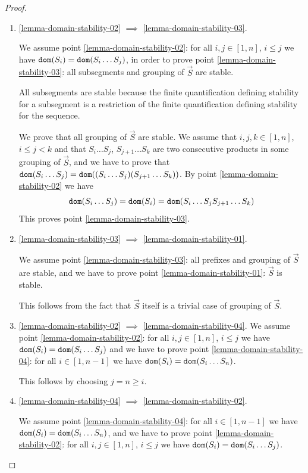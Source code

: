 \documentclass{lmcs}
\begin{document}
\begin{proof}
\begin{enumerate}
\item
\ref{lemma-domain-stability-02} $\implies$ \ref{lemma-domain-stability-03}.

We assume point \ref{lemma-domain-stability-02}: 
for all $i, j \in [1, n]$, $i \le j$ we have ${\tt dom}(S_i)  =  {\tt dom}(S_i \ldots S_j)$,
in order to prove point \ref{lemma-domain-stability-03}:
all subsegments and grouping of $\vec{S}$ are stable. 

All subsegments are stable because the finite quantification defining stability for a subsegment 
is a restriction of the finite quantification defining stability for the sequence. 

We prove that all grouping of $\vec{S}$ are stable. We assume that
$i, j,k\in [1, n]$, $i \le j < k$ and that $S_i \ldots S_j$, $S_{j+1} \ldots S_k$
are two consecutive products in some grouping of $\vec{S}$, and we have to prove 
that ${\tt dom}(S_i \ldots S_j) = {\tt dom}( (S_i \ldots S_j) (S_{j+1} \ldots S_k))$. 
By point \ref{lemma-domain-stability-02} we have 
$$
{\tt dom}(S_i \ldots S_j) = {\tt dom}(S_i) = {\tt dom}(S_i \ldots S_j S_{j+1} \ldots S_k)
$$
This proves point \ref{lemma-domain-stability-03}.


\item
\ref{lemma-domain-stability-03} $\implies$ \ref{lemma-domain-stability-01}.

We assume point \ref{lemma-domain-stability-03}: all prefixes 
and grouping of $\vec{S}$ are stable,
and we have to prove point \ref{lemma-domain-stability-01}: $\vec{S}$ is stable. 

This follows from the fact that $\vec{S}$ itself is a trivial case of grouping of $\vec{S}$.


\item
\ref{lemma-domain-stability-02} $\implies$  \ref{lemma-domain-stability-04}.
We assume point \ref{lemma-domain-stability-02}:
for all $i, j \in [1, n]$, $i \le j$ we have ${\tt dom}(S_i) =  {\tt dom}(S_i \ldots S_j)$
and we have to prove point \ref{lemma-domain-stability-04}: 
for all $i \in [1, n-1]$ we have ${\tt dom}(S_i) =  {\tt dom}(S_i \ldots S_n)$.

This follows by choosing $j=n \ge i$.


\item
\ref{lemma-domain-stability-04} $\implies$  \ref{lemma-domain-stability-02}.

We assume point \ref{lemma-domain-stability-04}: 
for all $i \in [1, n-1]$ we have ${\tt dom}(S_i) =  {\tt dom}(S_i \ldots S_n)$, and we have to prove
point \ref{lemma-domain-stability-02}: 
for all $i, j \in [1, n]$, $i \le j$ we have ${\tt dom}(S_i) =  {\tt dom}(S_i \ldots S_j)$.


\end{enumerate}
\end{proof}
\end{document}
